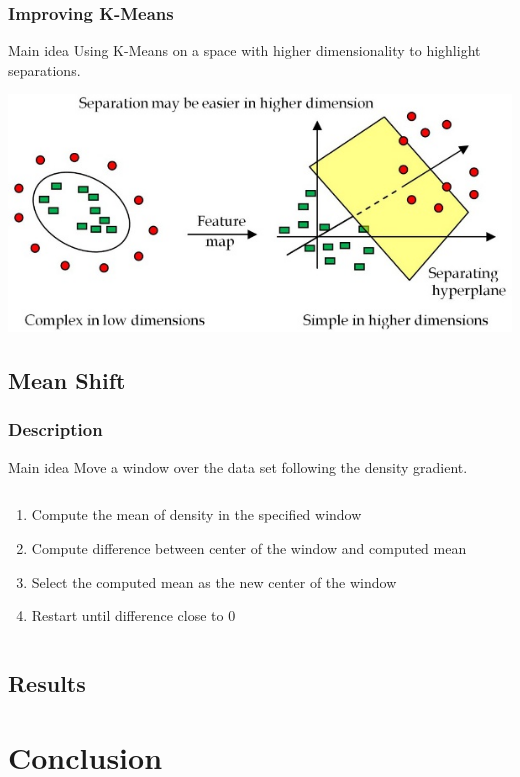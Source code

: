 \documentclass[10p]{beamer}
\begin{document}
\begin{frame}
{\begin{columns}
\begin{column}{0.5\textwidth}
\end{column}
\end{columns}
}
\end{frame}
\begin{frame}
\frametitle{Improving K-Means}
\begin{block}{Main idea}
Using K-Means on a space with higher dimensionality to highlight separations.
\end{block}
\includegraphics[width=\columnwidth]{Image/separation.jpeg}
\end{frame}
\subsection{Mean Shift}
\begin{frame}
\frametitle{Description}
\begin{block}{Main idea}
Move a window over the data set following the density gradient.
\end{block}
\begin{columns}
\begin{column}{0.6\textwidth}
\begin{enumerate}
\item Compute the mean of density in the specified window
\item Compute difference between center of the window and computed mean
\item Select the computed mean as the new center of the window
\item Restart until difference close to 0
\end{enumerate}
\end{column}
\begin{column}{0.4\textwidth}
\end{column}
\end{columns}
\end{frame}
\subsection{Results}
\begin{frame}

\end{frame}
\section{Conclusion}
\begin{frame}
\end{frame}
\end{document}
